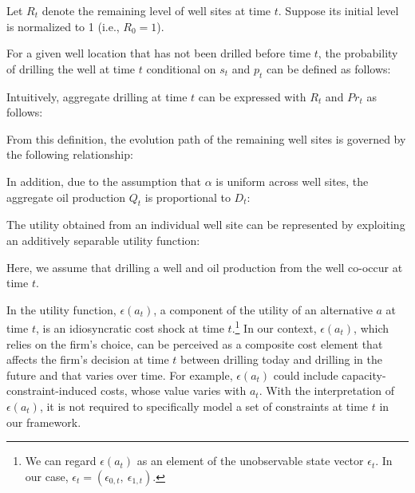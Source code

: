 Let $R_{t}$ denote the remaining level of well sites at time $t$. Suppose its initial level is normalized to 1 (i.e., $R_{0} = 1$).

For a given well location that has not been drilled before time $t$, the probability of drilling the well at time $t$ conditional on $s_{t}$ and $p_{t}$ can be defined as follows:


Intuitively, aggregate drilling at time $t$ can be expressed with $R_{t}$ and $Pr_{t}$ as follows:

From this definition, the evolution path of the remaining well sites is governed by the following relationship:

In addition, due to the assumption that $\alpha$ is uniform across well sites, the aggregate oil production $Q_{t}$ is proportional to $D_{t}$:


The utility obtained from an individual well site can be represented by exploiting an additively separable utility function:

Here, we assume that drilling a well and oil production from the well co-occur at time $t$. 

In the utility function, $\epsilon(a_{t})$, a component of the utility of an alternative $a$ at time $t$, is an idiosyncratic cost shock at time $t$.\footnote{We can regard $\epsilon(a_{t})$ as an element of the unobservable state vector $\epsilon_{t}$. In our case, $\epsilon_{t} = ( \epsilon_{0, t}, \ \epsilon_{1, t} )$.} In our context, $\epsilon(a_{t})$, which relies on the firm's choice, can be perceived as a composite cost element that affects the firm's decision at time $t$ between drilling today and drilling in the future and that varies over time. For example, $\epsilon(a_{t})$ could include capacity-constraint-induced costs, whose value varies with $a_{t}$. With the interpretation of $\epsilon(a_{t})$, it is not required to specifically model a set of constraints at time $t$ in our framework. 

